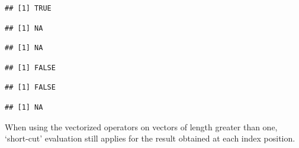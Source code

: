 \documentclass[krantz2]{krantz}\usepackage{knitr}%
\begin{document}
\begin{knitrout}\footnotesize
{}\color{fgcolor}\begin{kframe}
\begin{alltt}
 \hlopt{||} 
\end{alltt}
\begin{verbatim}
## [1] TRUE
\end{verbatim}
\begin{alltt}
 \hlopt{||} 
\end{alltt}
\begin{verbatim}
## [1] NA
\end{verbatim}
\begin{alltt}
 \hlopt{&&} 
\end{alltt}
\begin{verbatim}
## [1] NA
\end{verbatim}
\begin{alltt}
 \hlopt{&&} 
\end{alltt}
\begin{verbatim}
## [1] FALSE
\end{verbatim}
\begin{alltt}
 \hlopt{&&}  \hlopt{&&} 
\end{alltt}
\begin{verbatim}
## [1] FALSE
\end{verbatim}
\begin{alltt}
 \hlopt{&&}  \hlopt{&&} 
\end{alltt}
\begin{verbatim}
## [1] NA
\end{verbatim}
\end{kframe}
\end{knitrout}

When using the vectorized operators on vectors of length greater than one, `short-cut' evaluation still applies for the result obtained at each index position.
\end{document}
